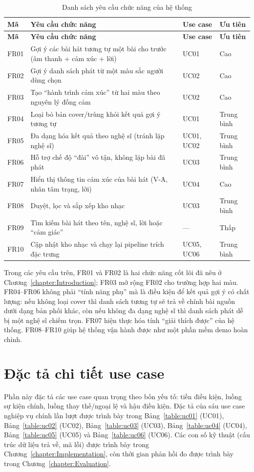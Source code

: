 \documentclass[../DoAn.tex]{subfiles}
\begin{document}
\begin{longtable}{|p{1.0cm}|p{7.6cm}|p{2.2cm}|p{1.8cm}|}
\caption{Danh sách yêu cầu chức năng của hệ thống}\label{table:fr}\\
\hline
\textbf{Mã} & \textbf{Yêu cầu chức năng} & \textbf{Use case} & \textbf{Ưu tiên} \\
\hline
\endfirsthead
\hline
\textbf{Mã} & \textbf{Yêu cầu chức năng} & \textbf{Use case} & \textbf{Ưu tiên} \\
\hline
\endhead
FR01 & Gợi ý các bài hát tương tự một bài cho trước (âm thanh + cảm xúc + lời) & UC01 & Cao \\
\hline
FR02 & Gợi ý danh sách phát từ một màu sắc người dùng chọn & UC02 & Cao \\
\hline
FR03 & Tạo ``hành trình cảm xúc'' từ hai màu theo nguyên lý đồng cảm & UC02 & Cao \\
\hline
FR04 & Loại bỏ bản cover/trùng khỏi kết quả gợi ý tương tự & UC01 & Trung bình \\
\hline
FR05 & Đa dạng hóa kết quả theo nghệ sĩ (tránh lặp nghệ sĩ) & UC01, UC02 & Trung bình \\
\hline
FR06 & Hỗ trợ chế độ ``đài'' vô tận, không lặp bài đã phát & UC03 & Trung bình \\
\hline
FR07 & Hiển thị thông tin cảm xúc của bài hát (V-A, nhãn tâm trạng, lời) & UC04 & Cao \\
\hline
FR08 & Duyệt, lọc và sắp xếp kho nhạc & UC03 & Trung bình \\
\hline
FR09 & Tìm kiếm bài hát theo tên, nghệ sĩ, lời hoặc ``cảm giác'' & --- & Thấp \\
\hline
FR10 & Cập nhật kho nhạc và chạy lại pipeline trích đặc trưng & UC05, UC06 & Trung bình \\
\hline
\end{longtable}

Trong các yêu cầu trên, FR01 và FR02 là hai chức năng cốt lõi đã nêu ở Chương~\ref{chapter:Introduction}; FR03 mở rộng FR02 cho trường hợp hai màu. FR04--FR06 không phải ``tính năng phụ'' mà là điều kiện để kết quả gợi ý có chất lượng: nếu không loại cover thì danh sách tương tự sẽ trả về chính bài nguồn dưới dạng bản phối khác, còn nếu không đa dạng nghệ sĩ thì danh sách phát dễ bị một nghệ sĩ chiếm trọn. FR07 hiện thực hóa tính ``giải thích được'' của hệ thống. FR08--FR10 giúp hệ thống vận hành được như một phần mềm demo hoàn chỉnh.

\section{Đặc tả chi tiết use case}
\label{section:2.3}
Phần này đặc tả các use case quan trọng theo bốn yếu tố: tiền điều kiện, luồng sự kiện chính, luồng thay thế/ngoại lệ và hậu điều kiện. Đặc tả của sáu use case nghiệp vụ chính lần lượt được trình bày trong Bảng~\ref{table:uc01} (UC01), Bảng~\ref{table:uc02} (UC02), Bảng~\ref{table:uc03} (UC03), Bảng~\ref{table:uc04} (UC04), Bảng~\ref{table:uc05} (UC05) và Bảng~\ref{table:uc06} (UC06). Các con số kỹ thuật (cấu trúc dữ liệu trả về, mã lỗi) được trình bày trong Chương~\ref{chapter:Implementation}, còn thời gian phản hồi đo được trình bày trong Chương~\ref{chapter:Evaluation}.
\end{document}
